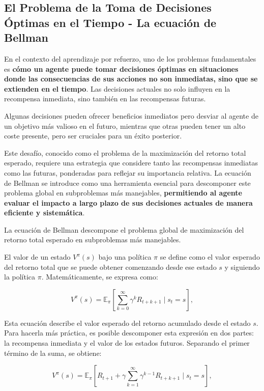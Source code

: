 \documentclass[a4paper,12pt, twoside]{report}
\begin{document}
\subsection{El Problema de la Toma de Decisiones Óptimas en el Tiempo - La ecuación de Bellman}


En el contexto del aprendizaje por refuerzo, uno de los problemas fundamentales es 
\textbf{cómo un agente puede tomar decisiones óptimas en situaciones donde las consecuencias de 
sus acciones no son inmediatas, sino que se extienden en el tiempo}. Las decisiones actuales no 
solo influyen en la recompensa inmediata, sino también en las recompensas futuras. 

Algunas decisiones pueden ofrecer beneficios inmediatos pero desviar al agente de un objetivo 
más valioso en el futuro, mientras que otras pueden tener un alto coste presente, pero ser 
cruciales para un éxito posterior.

Este desafío, conocido como el problema de la maximización del retorno total esperado, 
requiere una estrategia que considere tanto las recompensas inmediatas como las futuras, 
ponderadas para reflejar su importancia relativa. La ecuación de Bellman se introduce como 
una herramienta esencial para descomponer este problema global en subproblemas más manejables, 
\textbf{permitiendo al agente evaluar el impacto a largo plazo de sus decisiones actuales de 
manera eficiente y sistemática}.

La ecuación de Bellman descompone el problema global de maximización del retorno total 
esperado en subproblemas más manejables. 

El valor de un estado \(V^\pi(s)\) bajo una política \(\pi\) se define como el valor esperado 
del retorno total que se puede obtener comenzando desde ese estado \(s\) y siguiendo la política 
\(\pi\). Matemáticamente, se expresa como:

\begin{equation}
V^\pi(s) = \mathbb{E}_\pi \left[ \sum_{k=0}^{\infty} \gamma^k R_{t+k+1} \mid s_t = s \right],
\end{equation}

Esta ecuación describe el valor esperado del retorno acumulado desde el estado \(s\). 
Para hacerla más práctica, es posible descomponer esta expresión en dos partes: la 
recompensa inmediata y el valor de los estados futuros. Separando el primer término de 
la suma, se obtiene:

\begin{equation}
V^\pi(s) = \mathbb{E}_\pi \left[ R_{t+1} + \gamma \sum_{k=1}^{\infty} \gamma^{k-1} R_{t+k+1} \mid s_t = s \right],
\end{equation}
\end{document}
